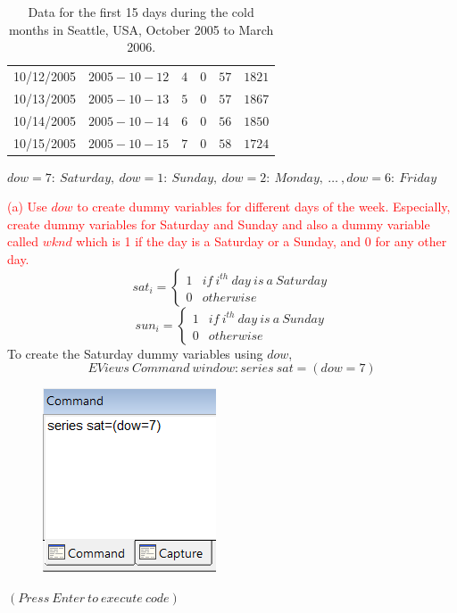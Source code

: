 \documentclass[12pt]{report}
\begin{document}
\begin{table}[H]
\begin{tabular}{lrrrrr}
		\multicolumn{1}{c}{10/12/2005}&\multicolumn{1}{r}{$2005-10-12$}&\multicolumn{1}{r}{$4$}&\multicolumn{1}{r}{$0$}&\multicolumn{1}{r}{$57$}&\multicolumn{1}{r}{$1821$}\\
		\multicolumn{1}{c}{10/13/2005}&\multicolumn{1}{r}{$2005-10-13$}&\multicolumn{1}{r}{$5$}&\multicolumn{1}{r}{$0$}&\multicolumn{1}{r}{$57$}&\multicolumn{1}{r}{$1867$}\\
		\multicolumn{1}{c}{10/14/2005}&\multicolumn{1}{r}{$2005-10-14$}&\multicolumn{1}{r}{$6$}&\multicolumn{1}{r}{$0$}&\multicolumn{1}{r}{$56$}&\multicolumn{1}{r}{$1850$}\\
		\multicolumn{1}{c}{10/15/2005}&\multicolumn{1}{r}{$2005-10-15$}&\multicolumn{1}{r}{$7$}&\multicolumn{1}{r}{$0$}&\multicolumn{1}{r}{$58$}&\multicolumn{1}{r}{$1724$}\\
	\end{tabular}
	\caption{Data for the first 15 days during the cold months in Seattle, USA, October 2005 to March 2006.}
\end{table} \centering $dow=7:\ Saturday,\ dow=1:\ Sunday,\ dow=2:\ Monday,\ \dots\ ,  dow=6:\ Friday$


\newpage
\justify \noindent \textcolor{red}
{
	(a) Use $dow$ to create dummy variables for different days of the week. Especially, create dummy variables for Saturday and Sunday and also a dummy variable called $wknd$ which is 1 if the day is a Saturday or a Sunday, and 0 for any other day.
}
\begin{equation*}
	sat_i = \begin{cases}
		1 & if\ i^{th}\ day\ is\ a\ Saturday \\
		0 & otherwise
	\end{cases}
\end{equation*}
\begin{equation*}
	sun_i = \begin{cases}
	1 & if\ i^{th}\ day\ is\ a\ Sunday \\
	0 & otherwise
	\end{cases}
\end{equation*}
\noindent To create the Saturday dummy variables using $dow$,
$$EViews\ Command\ window: series\ sat=(dow=7)$$
\begin{figure}[H]
	\centering
	\includegraphics{q1_1}
\end{figure} \vspace{-\baselineskip} \centering $(Press\ Enter\ to\ execute\ code)$
\end{document}
